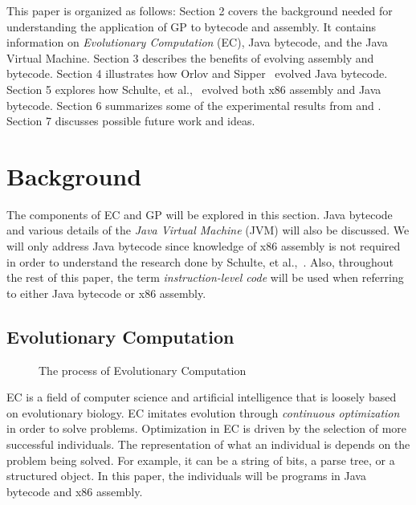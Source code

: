 \documentclass{sig-alternate}
\begin{document}
This paper is organized as follows: Section 2 covers the background needed for understanding the application of GP to bytecode and assembly. It contains information on \textit{Evolutionary Computation} (EC), Java bytecode, and the Java Virtual Machine. Section 3 describes the benefits of evolving assembly and bytecode. Section 4 illustrates how Orlov and Sipper~\cite{FINCH:2011} evolved Java bytecode. Section 5 explores how Schulte, et al.,~\cite{Assembly:2010} evolved both x86 assembly and Java bytecode. Section 6 summarizes some of the experimental results from \cite{FINCH:2011} and \cite{Assembly:2010}. Section 7 discusses possible future work and ideas.  
	
	

\section{Background}


The components of EC and GP will be explored in this section. Java bytecode and various details of the \textit{Java Virtual Machine} (JVM) will also be discussed. We will only address Java bytecode since knowledge of x86 assembly is not required in order to understand the research done by Schulte, et al.,~\cite{Assembly:2010}. Also, throughout the rest of this paper, the term \textit{instruction-level code} will be used when referring to either Java bytecode or x86 assembly.
\subsection{Evolutionary Computation}
\begin{figure}
\centering
{}

\caption{The process of Evolutionary Computation}
\label{ECdiagram}
\end{figure}


EC is a field of computer science and artificial intelligence that is loosely based on evolutionary biology. EC imitates evolution through \textit{continuous optimization} in order to solve problems. Optimization in EC is driven by the selection of more successful individuals. The representation of what an individual is depends on the problem being solved. For example, it can be a string of bits, a parse tree, or a structured object. In this paper, the individuals will be programs in Java bytecode and x86 assembly.\par 
\end{document}
